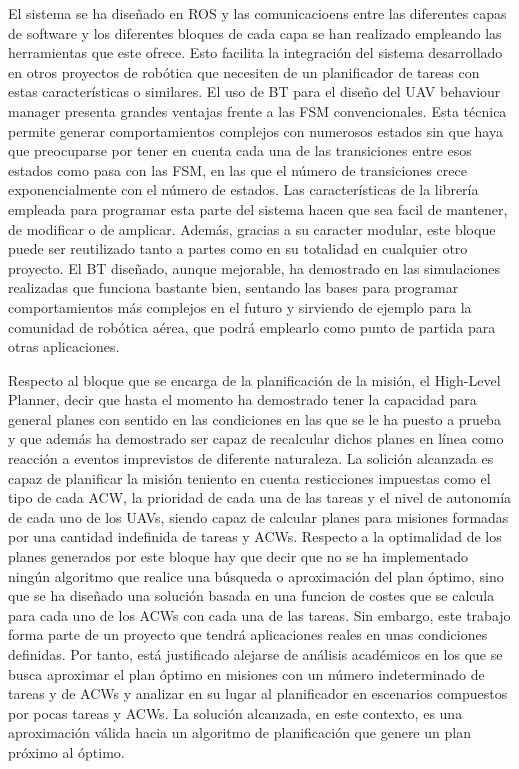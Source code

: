 \documentclass[fontsize=11pt, English=false, Español=true, Myfinal=true, twoside, numbers=noenddot]{scrbook}
\begin{document}
El sistema se ha diseñado en ROS y las comunicacioens entre las diferentes capas de software y los diferentes bloques de cada capa se han realizado empleando las herramientas que este ofrece. Esto facilita la integración del sistema desarrollado en otros proyectos de robótica que necesiten de un planificador de tareas con estas características o similares. El uso de BT para el diseño del UAV behaviour manager presenta grandes ventajas frente a las FSM convencionales. Esta técnica permite generar comportamientos complejos con numerosos estados sin que haya que preocuparse por tener en cuenta cada una de las transiciones entre esos estados como pasa con las FSM, en las que el número de transiciones crece exponencialmente con el número de estados. Las características de la librería empleada para programar esta parte del sistema hacen que sea facil de mantener, de modificar o de amplicar. Además, gracias a su caracter modular, este bloque puede ser reutilizado tanto a partes como en su totalidad en cualquier otro proyecto. El BT diseñado, aunque mejorable, ha demostrado en las simulaciones realizadas que funciona bastante bien, sentando las bases para programar comportamientos más complejos en el futuro y sirviendo de ejemplo para la comunidad de robótica aérea, que podrá emplearlo como punto de partida para otras aplicaciones. 

Respecto al bloque que se encarga de la planificación de la misión, el High-Level Planner, decir que hasta el momento ha demostrado tener la capacidad para general planes con sentido en las condiciones en las que se le ha puesto a prueba y que además ha demostrado ser capaz de recalcular dichos planes en línea como reacción a eventos imprevistos de diferente naturaleza. La solición alcanzada es capaz de planificar la misión teniento en cuenta resticciones impuestas como el tipo de cada ACW, la prioridad de cada una de las tareas y el nivel de autonomía de cada uno de los UAVs, siendo capaz de calcular planes para misiones formadas por una cantidad indefinida de tareas y ACWs. Respecto a la optimalidad de los planes generados por este bloque hay que decir que no se ha implementado ningún algoritmo que realice una búsqueda o aproximación del plan óptimo, sino que se ha diseñado una solución basada en una funcion de costes que se calcula para cada uno de los ACWs con cada una de las tareas. Sin embargo, este trabajo forma parte de un proyecto que tendrá aplicaciones reales en unas condiciones definidas. Por tanto, está justificado alejarse de análisis académicos en los que se busca aproximar el plan óptimo en misiones con un número indeterminado de tareas y de ACWs y analizar en su lugar al planificador en escenarios compuestos por pocas tareas y ACWs. La solución alcanzada, en este contexto, es una aproximación válida hacia un algoritmo de planificación que genere un plan próximo al óptimo.
\end{document}
